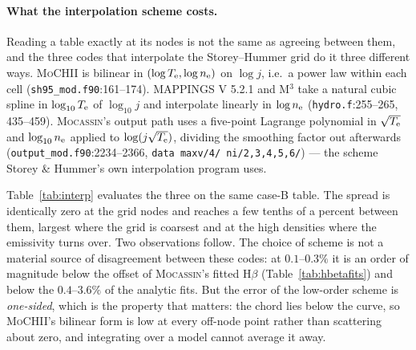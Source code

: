 \documentclass[english,a4paper]{my_memo}
\newcommand{\code}[1]{\texttt{#1}}
\newcommand{\MoCHII}{\textsc{MoCHII}}
\newcommand{\Mthree}{M$^3$}
\newcommand{\Mappings}{MAPPINGS V 5.2.1}
\newcommand{\Mocassin}{\textsc{Mocassin}}
\newcommand{\Te}{T_{\rm e}}
\newcommand{\nelec}{n_{\rm e}}
\begin{document}
\paragraph{What the interpolation scheme costs.}  Reading a table exactly at
its nodes is not the same as agreeing between them, and the three codes that
interpolate the Storey--Hummer grid do it three different ways.  \MoCHII{} is
bilinear in $(\log \Te, \log \nelec)$ on $\log j$, i.e.\ a power law within
each cell (\code{sh95\_mod.f90}:161--174).  \Mappings{} and \Mthree{} take a
natural cubic spline in $\log_{10}\Te$ of $\log_{10} j$ and interpolate
linearly in $\log \nelec$ (\code{hydro.f}:255--265, 435--459).  \Mocassin{}'s
output path uses a five-point Lagrange polynomial in $\sqrt{\Te}$ and
$\log_{10}\nelec$ applied to $\log(j\sqrt{\Te})$, dividing the smoothing
factor out afterwards (\code{output\_mod.f90}:2234--2366,
\code{data maxv/4/ ni/2,3,4,5,6/}) --- the scheme Storey \& Hummer's own
interpolation program uses.

Table~\ref{tab:interp} evaluates the three on the same case-B table.  The
spread is identically zero at the grid nodes and reaches a few tenths of a
percent between them, largest where the grid is coarsest and at the high
densities where the emissivity turns over.  Two observations follow.  The
choice of scheme is not a material source of disagreement between these codes:
at $0.1$--$0.3\%$ it is an order of magnitude below the offset of
\Mocassin{}'s fitted H$\beta$ (Table~\ref{tab:hbetafits}) and below the
$0.4$--$3.6\%$ of the analytic fits.  But the error of the low-order scheme is
\emph{one-sided}, which is the property that matters: the chord lies below the
curve, so \MoCHII{}'s bilinear form is low at every off-node point rather than
scattering about zero, and integrating over a model cannot average it away.
\end{document}
